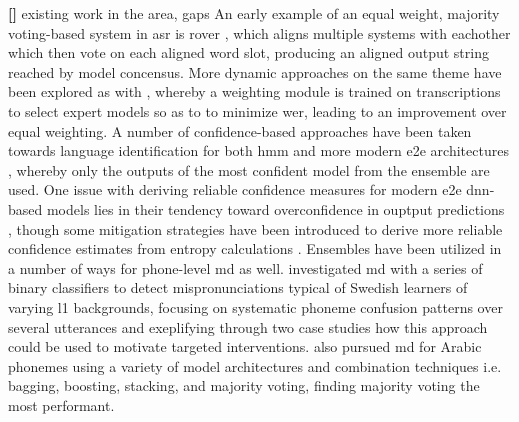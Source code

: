 \documentclass[thesis]{cluu}
\newcounter{paranum}
\newcommand{\numberedparagraph}{\par\refstepcounter{paranum}\textbf{[\theparanum] }}
\begin{document}
\numberedparagraph{existing work in the area, gaps}
An early example of an equal weight, majority voting-based system in \gls{asr} is \gls{rover} \parencite{fiscus1997post}, which aligns multiple systems with eachother which then vote on each aligned word slot, producing an aligned output string reached by model concensus. More dynamic approaches on the same theme have been explored as with \textcite{agrawalLearningWhenTrust2023}, whereby a weighting module is trained on transcriptions to select expert models so as to to minimize \gls{wer}, leading to an improvement over equal weighting. A number of confidence-based approaches have been taken towards language identification for both \gls{hmm} and more modern \gls{e2e} architectures \textcite{gitmanConfidencebasedEnsemblesEndtoEnd2023}, whereby only the outputs of the most confident model from the ensemble are used. One issue with deriving reliable confidence measures for modern \gls{e2e} \gls{dnn}-based models lies in their tendency toward overconfidence in ouptput predictions \parencite{weiMitigatingNeuralNetwork2022}, though some mitigation strategies have been introduced to derive more reliable confidence estimates from entropy calculations \parencite{laptevFastEntropyBasedMethods2023}. Ensembles have been utilized in a number of ways for phone-level \gls{md} as well. \textcite{ananthakrishnanUsingEnsembleClassifiers2011} investigated \gls{md} with a series of binary classifiers to detect mispronunciations typical of Swedish learners of varying \gls{l1} backgrounds, focusing on systematic phoneme confusion patterns over several utterances and exeplifying through two case studies how this approach could be used to motivate targeted interventions. \textcite{calikEnsemblebasedFrameworkMispronunciation2023a} also pursued \gls{md} for Arabic phonemes using a variety of model architectures and combination techniques i.e. bagging, boosting, stacking, and majority voting, finding majority voting the most performant.  
\end{document}
